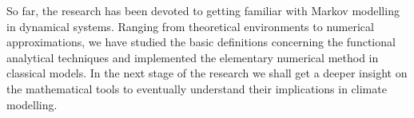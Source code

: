 So far, the research has been devoted to getting familiar with Markov modelling in dynamical systems. Ranging from theoretical environments to numerical approximations, we have studied the basic definitions concerning the functional analytical techniques and implemented the elementary numerical method in classical models. In the next stage of the research we shall get a deeper insight on the mathematical tools to eventually understand their implications in climate modelling.


